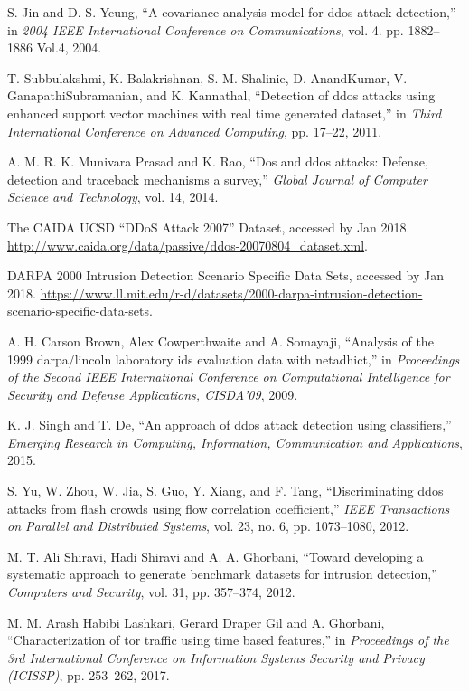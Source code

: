 \documentclass[12pt]{report}
\begin{document}
\begin{thebibliography}{99}
S. Jin and D. S. Yeung, ``A covariance analysis model for ddos attack detection,'' in \textit{2004 IEEE International Conference on Communications}, vol. 4. pp. 1882--1886 Vol.4, 2004.

T. Subbulakshmi, K. Balakrishnan, S. M. Shalinie, D. AnandKumar, V. GanapathiSubramanian, and K. Kannathal, ``Detection of ddos attacks using enhanced support vector machines with real time generated dataset,'' in \textit{Third International Conference on Advanced Computing}, pp. 17--22, 2011.

A. M. R. K. Munivara Prasad and K. Rao, ``Dos and ddos attacks: Defense, detection and traceback mechanisms a survey,'' \textit{Global Journal of Computer Science and Technology}, vol. 14, 2014.

The CAIDA UCSD ``DDoS Attack 2007'' Dataset, accessed by Jan 2018. \url{http://www.caida.org/data/passive/ddos-20070804_dataset.xml}.

DARPA 2000 Intrusion Detection Scenario Specific Data Sets, accessed by Jan 2018. \url{https://www.ll.mit.edu/r-d/datasets/2000-darpa-intrusion-detection-scenario-specific-data-sets}.

A. H. Carson Brown, Alex Cowperthwaite and A. Somayaji, ``Analysis of the 1999 darpa/lincoln laboratory ids evaluation data with netadhict,'' in \textit{Proceedings of the Second IEEE International Conference on Computational Intelligence for Security and Defense Applications, CISDA'09}, 2009.

K. J. Singh and T. De, ``An approach of ddos attack detection using classifiers,'' \textit{Emerging Research in Computing, Information, Communication and Applications}, 2015.

S. Yu, W. Zhou, W. Jia, S. Guo, Y. Xiang, and F. Tang, ``Discriminating ddos attacks from flash crowds using flow correlation coefficient,'' \textit{IEEE Transactions on Parallel and Distributed Systems}, vol. 23, no. 6, pp. 1073--1080, 2012.

M. T. Ali Shiravi, Hadi Shiravi and A. A. Ghorbani, ``Toward developing a systematic approach to generate benchmark datasets for intrusion detection,'' \textit{Computers and Security}, vol. 31, pp. 357--374, 2012.

M. M. Arash Habibi Lashkari, Gerard Draper Gil and A. Ghorbani, ``Characterization of tor traffic using time based features,'' in \textit{Proceedings of the 3rd International Conference on Information Systems Security and Privacy (ICISSP)}, pp. 253--262, 2017.


\end{thebibliography}
\end{document}
